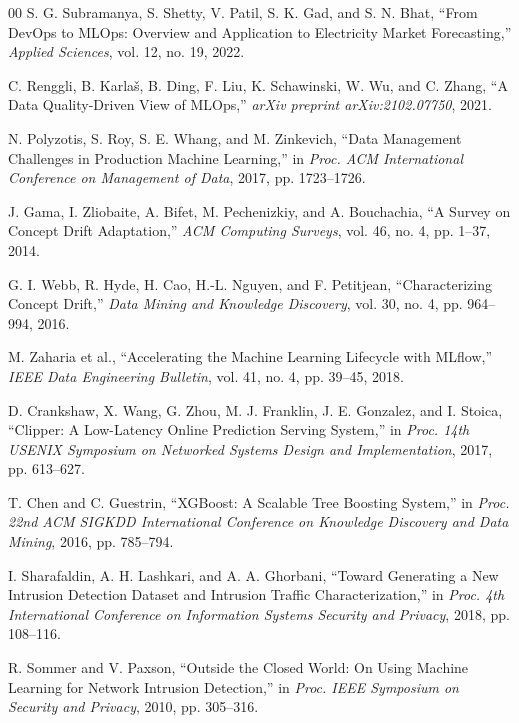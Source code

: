 \documentclass[runningheads]{llncs}
\begin{document}
\begin{thebibliography}{00}
S. G. Subramanya, S. Shetty, V. Patil, S. K. Gad, and S. N. Bhat, ``From DevOps to MLOps: Overview and Application to Electricity Market Forecasting,'' \textit{Applied Sciences}, vol. 12, no. 19, 2022.

C. Renggli, B. Karlaš, B. Ding, F. Liu, K. Schawinski, W. Wu, and C. Zhang, ``A Data Quality-Driven View of MLOps,'' \textit{arXiv preprint arXiv:2102.07750}, 2021.

N. Polyzotis, S. Roy, S. E. Whang, and M. Zinkevich,
``Data Management Challenges in Production Machine Learning,''
in \textit{Proc. ACM International Conference on Management of Data}, 2017,
pp. 1723--1726.

J. Gama, I. Zliobaite, A. Bifet, M. Pechenizkiy, and A. Bouchachia, ``A Survey on Concept Drift Adaptation,'' \textit{ACM Computing Surveys}, vol. 46, no. 4, pp. 1--37, 2014.

G. I. Webb, R. Hyde, H. Cao, H.-L. Nguyen, and F. Petitjean,
``Characterizing Concept Drift,''
\textit{Data Mining and Knowledge Discovery}, vol. 30, no. 4,
pp. 964--994, 2016.

M. Zaharia et al., ``Accelerating the Machine Learning Lifecycle with MLflow,'' \textit{IEEE Data Engineering Bulletin}, vol. 41, no. 4, pp. 39--45, 2018.

D. Crankshaw, X. Wang, G. Zhou, M. J. Franklin, J. E. Gonzalez, and I. Stoica,
``Clipper: A Low-Latency Online Prediction Serving System,''
in \textit{Proc. 14th USENIX Symposium on Networked Systems Design and Implementation},
2017, pp. 613--627.

T. Chen and C. Guestrin, ``XGBoost: A Scalable Tree Boosting System,'' in \textit{Proc. 22nd ACM SIGKDD International Conference on Knowledge Discovery and Data Mining}, 2016, pp. 785--794.

I. Sharafaldin, A. H. Lashkari, and A. A. Ghorbani, ``Toward Generating a New Intrusion Detection Dataset and Intrusion Traffic Characterization,'' in \textit{Proc. 4th International Conference on Information Systems Security and Privacy}, 2018, pp. 108--116.

R. Sommer and V. Paxson,
``Outside the Closed World: On Using Machine Learning for Network Intrusion Detection,''
in \textit{Proc. IEEE Symposium on Security and Privacy}, 2010, pp. 305--316.


\end{thebibliography}
\end{document}
